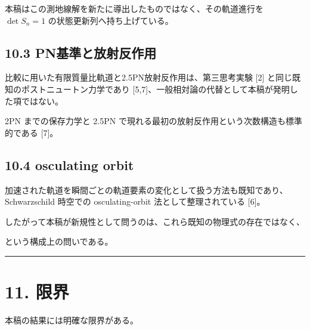 \documentclass[
  a4paper,
]{ltjsarticle}
\begin{document}
本稿はこの測地線解を新たに導出したものではなく、その軌道進行を
\(\det S_n=1\) の状態更新列へ持ち上げている。

\subsection{10.3
PN基準と放射反作用}\label{pnux57faux6e96ux3068ux653eux5c04ux53cdux4f5cux7528}

比較に用いた有限質量比軌道と2.5PN放射反作用は、第三思考実験 {[}2{]}
と同じ既知のポストニュートン力学であり
{[}5,7{]}、一般相対論の代替として本稿が発明した項ではない。

2PN までの保存力学と 2.5PN
で現れる最初の放射反作用という次数構造も標準的である {[}7{]}。

\subsection{10.4 osculating orbit}\label{osculating-orbit}

加速された軌道を瞬間ごとの軌道要素の変化として扱う方法も既知であり、Schwarzschild
時空での osculating-orbit 法として整理されている {[}6{]}。

したがって本稿が新規性として問うのは、これら既知の物理式の存在ではなく、

\begin{center}
\end{center}

という構成上の問いである。

\begin{center}\rule{0.5\linewidth}{0.5pt}\end{center}

\section{11. 限界}\label{ux9650ux754c}

本稿の結果には明確な限界がある。
\end{document}
